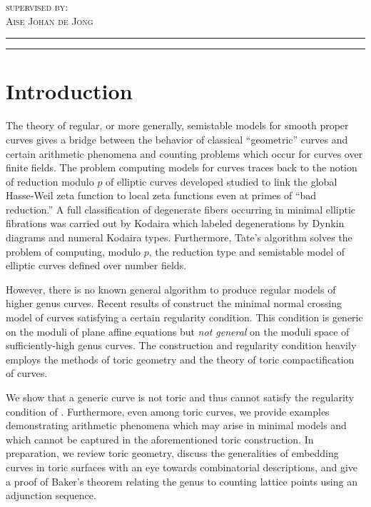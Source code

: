 \documentclass[12pt]{article}
\begin{document}
\begin{titlepage}
	\vspace{0.05 \textheight}
	
	{\textsc{supervised by:}}
	\\
	{\large\textsc{Aise Johan de Jong}}
	
	\vspace{0.1\textheight} %
	
	
	\rule{\textwidth}{0.4pt} %
	
	\vspace{2pt}\vspace{-\baselineskip} %
	
	\rule{\textwidth}{1pt} %
	
\end{titlepage}

\section{Introduction}

The theory of regular, or more generally, semistable models for smooth proper curves gives a bridge between the behavior of classical ``geometric'' curves and certain arithmetic phenomena and counting problems which occur for curves over finite fields. The problem computing models for curves traces back to the notion of reduction modulo $p$ of elliptic curves developed studied to link the global Hasse-Weil zeta function to local zeta functions even at primes of ``bad reduction.'' A full classification of degenerate fibers occurring in minimal elliptic fibrations was carried out by Kodaira \cite{kodaira} which labeled degenerations by Dynkin diagrams and numeral Kodaira types. Furthermore, Tate's algorithm \cite{tate} solves the problem of computing, modulo $p$, the reduction type and semistable model of elliptic curves defined over number fields.
\par
However, there is no known general algorithm to produce regular models of higher genus curves. Recent results of \cite{tim} construct the minimal normal crossing model of curves satisfying a certain regularity condition. This condition is generic on the moduli of plane affine equations but \textit{not general} on the moduli space of sufficiently-high genus curves. The construction and regularity condition heavily employs the methods of toric geometry and the theory of toric compactification of curves.
\par
We show that a generic curve is not toric and thus cannot satisfy the regularity condition of \cite{tim}. Furthermore, even among toric curves, we provide examples demonstrating arithmetic phenomena which may arise in minimal models and which cannot be captured in the aforementioned toric construction. In preparation, we review toric geometry, discuss the generalities of embedding curves in toric surfaces with an eye towards combinatorial descriptions, and give a proof of Baker's theorem relating the genus to counting lattice points using an adjunction sequence.
\end{document}
